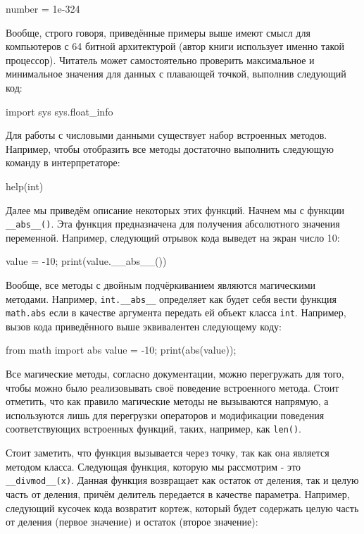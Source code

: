\begin{python}
number = 1e-324
\end{python}

Вообще, строго говоря, приведённые примеры выше имеют смысл для компьютеров с 64 
битной архитектурой (автор книги использует именно такой процессор). Читатель
может самостоятельно проверить максимальное и минимальное значения для данных с плавающей 
точкой, выполнив следующий код:

\begin{python}
import sys
sys.float_info
\end{python}

Для работы с числовыми данными существует набор встроенных методов. Например, чтобы отобразить 
все методы достаточно выполнить следующую команду в интерпретаторе:

\begin{python}
help(int)
\end{python}

Далее мы приведём описание некоторых этих функций. Начнем мы с функции \texttt{\_\_abs\_\_()}. Эта функция 
предназначена для получения абсолютного значения переменной. Например, следующий отрывок кода
выведет на экран число 10: 

\begin{python}
value = -10;
print(value.__abs__())
\end{python} 

Вообще, все методы с двойным подчёркиванием являются магическими методами. Например, \texttt{int.\_\_abs\_\_} 
определяет как будет себя вести функция \texttt{math.abs} если в качестве аргумента передать ей
объект класса \texttt{int}. Например, вызов кода приведённого выше эквивалентен следующему коду:

\begin{python}
from math import abs
value = -10;
print(abs(value));
\end{python} 

Все магические методы, согласно документации, можно перегружать для того, чтобы можно было реализовывать
своё поведение встроенного метода. Стоит отметить, что как правило магические методы не вызываются
напрямую, а используются лишь для перегрузки операторов и модификации поведения соответствующих
встроенных функций, таких, например, как \texttt{len()}.

Стоит заметить, что функция вызывается через точку, так как она является методом класса. 
Следующая функция, которую мы рассмотрим - это \texttt{\_\_divmod\_\_(x)}. Данная функция 
возвращает как остаток от деления, так и целую часть от деления, причём делитель передается 
в качестве параметра. Например, следующий кусочек кода возвратит кортеж, который будет содержать 
целую часть от деления (первое значение) и остаток (второе значение):

